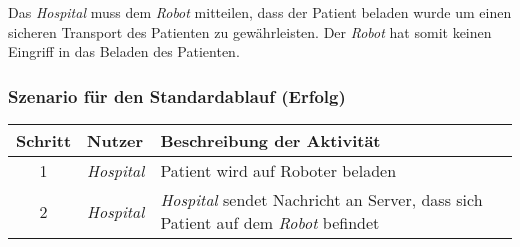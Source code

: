 			Das \emph{Hospital} muss dem \emph{Robot} mitteilen, dass der Patient beladen wurde um einen sicheren Transport des Patienten zu gewährleisten. Der \emph{Robot} hat somit keinen Eingriff in das Beladen des Patienten.

			\subsubsection*{Szenario für den Standardablauf (Erfolg)}

			\begin{table}[H]
				\centering
				\begin{tabularx}{\textwidth}{@{}cp{2cm}X@{}}
				\hline
				Schritt & Nutzer & Beschreibung der Aktivität \\ \hline
				1 & \emph{Hospital} & Patient wird auf Roboter beladen \\
				2 & \emph{Hospital} & \emph{Hospital} sendet Nachricht an Server, dass sich Patient auf dem \emph{Robot} befindet \\
				\hline
				\end{tabularx}
			\end{table}


	\pagebreak
